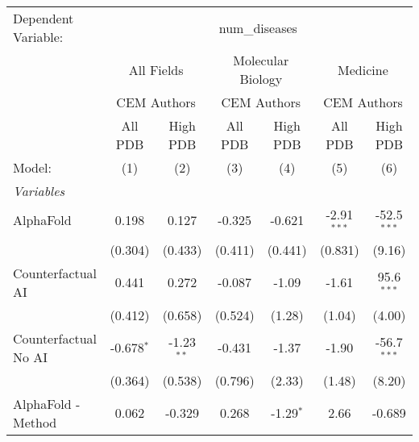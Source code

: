 \begingroup
\centering
\begin{tabular}{lcccccc}
   \tabularnewline \midrule \midrule
   Dependent Variable: & \multicolumn{6}{c}{num\_diseases}\\
 & \multicolumn{2}{c}{All Fields} & \multicolumn{2}{c}{Molecular Biology} & \multicolumn{2}{c}{Medicine} \\
\cmidrule(lr){2-3} \cmidrule(lr){4-5} \cmidrule(lr){6-7}
 & \multicolumn{2}{c}{CEM Authors} & \multicolumn{2}{c}{CEM Authors} & \multicolumn{2}{c}{CEM Authors} \\
\cmidrule(lr){2-3} \cmidrule(lr){4-5} \cmidrule(lr){6-7}
 & \multicolumn{1}{c}{All PDB} & \multicolumn{1}{c}{High PDB} & \multicolumn{1}{c}{All PDB} & \multicolumn{1}{c}{High PDB} & \multicolumn{1}{c}{All PDB} & \multicolumn{1}{c}{High PDB} \\
\cmidrule(lr){2-2} \cmidrule(lr){3-3} \cmidrule(lr){4-4} \cmidrule(lr){5-5} \cmidrule(lr){6-6} \cmidrule(lr){7-7}
   Model:                                                     & (1)          & (2)           & (3)          & (4)           & (5)           & (6)\\  
   \midrule
   \emph{Variables}\\
   AlphaFold                                                  & 0.198        & 0.127         & -0.325       & -0.621        & -2.91$^{***}$ & -52.5$^{***}$\\   
                                                              & (0.304)      & (0.433)       & (0.411)      & (0.441)       & (0.831)       & (9.16)\\   
   Counterfactual AI                                          & 0.441        & 0.272         & -0.087       & -1.09         & -1.61         & 95.6$^{***}$\\   
                                                              & (0.412)      & (0.658)       & (0.524)      & (1.28)        & (1.04)        & (4.00)\\   
   Counterfactual No AI                                       & -0.678$^{*}$ & -1.23$^{**}$  & -0.431       & -1.37         & -1.90         & -56.7$^{***}$\\   
                                                              & (0.364)      & (0.538)       & (0.796)      & (2.33)        & (1.48)        & (8.20)\\   
   AlphaFold - Method                                         & 0.062        & -0.329        & 0.268        & -1.29$^{*}$   & 2.66          & -0.689\\   

\end{tabular}
